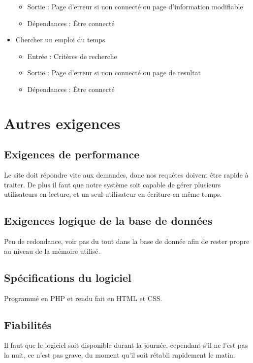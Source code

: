 \documentclass[a4paper, 11pt]{article}
\begin{document}
\begin{itemize}
\begin{itemize}
			\item Sortie : Page d'erreur si non connecté ou page d'information modifiable
			\item Dépendances : Être connecté
		\end{itemize}
		\item Chercher un emploi du temps
		\begin{itemize}
			\item Entrée : Critères de recherche
			\item Sortie : Page d'erreur si non connecté ou page de resultat
			\item Dépendances : Être connecté
		\end{itemize}
	\end{itemize}
        \section{ Autres exigences}
        \subsection{Exigences de performance}
        Le site doit répondre vite aux demandes, donc nos requêtes doivent être rapide à traiter. De plus il faut que notre système soit capable de gérer plusieurs utilisateurs en lecture, et un seul utilisateur en écriture en même temps.
        \subsection{ Exigences logique de la base de données}
        Peu de redondance, voir pas du tout dans la base de donnée afin de rester propre au niveau de la mémoire utilisé.
        \subsection{Spécifications du logiciel}
        Programmé en PHP et rendu fait en HTML et CSS.
        \subsection{Fiabilités}
        Il faut que le logiciel soit disponible durant la journée, cependant s'il ne l'est pas la nuit, ce n'est pas grave, du moment qu'il soit rétabli rapidement le matin. 
\end{document}
